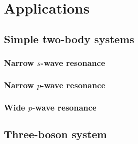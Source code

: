 \section{Applications}
\subsection{Simple two-body systems}
\subsubsection{Narrow $s$-wave resonance}
\subsubsection{Narrow $p$-wave resonance}
\subsubsection{Wide $p$-wave resonance}
\subsection{Three-boson system}